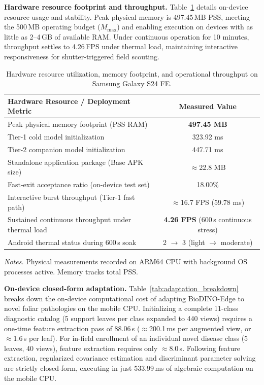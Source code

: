 \textbf{Hardware resource footprint and throughput.} Table~\ref{tab:hardware_footprint} details on-device resource usage and stability. Peak physical memory is 497.45\,MB PSS, meeting the 500\,MB operating budget ($M_{\max}$) and enabling execution on devices with as little as 2--4\,GB of available RAM. Under continuous operation for 10 minutes, throughput settles to 4.26\,FPS under thermal load, maintaining interactive responsiveness for shutter-triggered field scouting.

\begin{table}[htbp]
\caption{Hardware resource utilization, memory footprint, and operational throughput on Samsung Galaxy S24 FE.}
\label{tab:hardware_footprint}
\centering

\footnotesize
\setlength{\tabcolsep}{4pt}
\begin{tabular*}{\textwidth}{@{\extracolsep{\fill}}lc}
\toprule
\textbf{Hardware Resource / Deployment Metric} & \textbf{Measured Value} \\
\midrule
Peak physical memory footprint (PSS RAM) & \textbf{497.45 MB} \\
Tier-1 cold model initialization & 323.92 ms \\
Tier-2 companion model initialization & 447.71 ms \\
Standalone application package (Base APK size) & $\approx$22.8 MB \\
Fast-exit acceptance ratio (on-device test set) & 18.00\% \\
Interactive burst throughput (Tier-1 fast path) & $\approx$16.7 FPS (59.78 ms) \\
Sustained continuous throughput under thermal load & \textbf{4.26 FPS} (600\,s continuous stress) \\
Android thermal status during 600\,s soak & 2 $\rightarrow$ 3 (light $\rightarrow$ moderate) \\
\bottomrule
\end{tabular*}

\vspace{3pt}
\begin{minipage}{\textwidth}
\footnotesize
\textit{Notes.} Physical measurements recorded on ARM64 CPU with background OS processes active. Memory tracks total PSS.
\end{minipage}
\end{table}

\textbf{On-device closed-form adaptation.} Table~\ref{tab:adaptation_breakdown} breaks down the on-device computational cost of adapting BioDINO-Edge to novel foliar pathologies on the mobile CPU. Initializing a complete 11-class diagnostic catalog (5 support leaves per class expanded to 440 views) requires a one-time feature extraction pass of 88.06\,s ($\approx$200.1\,ms per augmented view, or $\approx$1.6\,s per leaf). For in-field enrollment of an individual novel disease class (5 leaves, 40 views), feature extraction requires only $\approx$8.0\,s. Following feature extraction, regularized covariance estimation and discriminant parameter solving are strictly closed-form, executing in just 533.99\,ms of algebraic computation on the mobile CPU.

